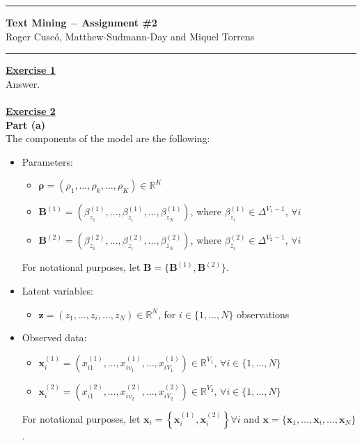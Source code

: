 \documentclass[a4paper, 11pt]{article}
\newcommand{\header}[2]{
\begin{flushleft}
		\rule{\linewidth}{0.6pt}
		\vspace{0.01cm}
		
		{\large{#1}}\\
		\vspace{0.1in}
		{#2}\\
		\vspace{0.1in}
		
		\rule{\linewidth}{0.6pt}
\end{flushleft}
}
\begin{document}
\header{\textbf{Text Mining $-$ Assignment \#2}}{Roger Cuscó, Matthew-Sudmann-Day and Miquel Torrens}
\textbf{\underline{Exercise 1}}\\
\newline Answer.\\
\pagebreak
\\
\newline \textbf{\underline{Exercise 2}}\\
\newline \textbf{Part (a)}\\
\newline The components of the model are the following:
\begin{itemize}
\item Parameters:
\begin{itemize}
\item $\pmb{\rho} = ( \rho_1, \dots, \rho_k, \dots, \rho_K ) \in \mathbb{R}^K$
\item $\mathbf{B}^{(1)} = \left( \beta_{z_1}^{(1)}, \dots, \beta_{z_i}^{(1)}, \dots, \beta_{z_N}^{(1)} \right)$, where $\beta_{z_i}^{(1)} \in \Delta^{V_1 - 1}$, $\forall i$
\item $\mathbf{B}^{(2)} = \left( \beta_{z_1}^{(2)}, \dots, \beta_{z_i}^{(2)}, \dots, \beta_{z_N}^{(2)} \right)$, where $\beta_{z_i}^{(2)} \in \Delta^{V_2 - 1}$, $\forall i$
\end{itemize}
For notational purposes, let $\mathbf{B} = \{ \mathbf{B}^{(1)}, \mathbf{B}^{(2)} \}$.
\item Latent variables:
\begin{itemize}
\item $\mathbf{z} = (z_1, \dots, z_i, \dots, z_N) \in \mathbb{R}^{N}$, for $i \in \{ 1, \dots, N \}$ observations
\end{itemize}
\item Observed data:
\begin{itemize}
\item $\mathbf{x}_i^{(1)} = \left( x_{i1}^{(1)}, \dots, x_{iv_1}^{(1)}, \dots, x_{iV_1}^{(1)} \right) \in \mathbb{R}^{V_1}$, $\forall i \in \{ 1, \dots, N \}$
\item $\mathbf{x}_i^{(2)} = \left( x_{i1}^{(2)}, \dots, x_{iv_2}^{(2)}, \dots, x_{iV_2}^{(2)} \right) \in \mathbb{R}^{V_2}$, $\forall i \in \{ 1, \dots, N \}$
\end{itemize}
For notational purposes, let $\mathbf{x}_i = \left\{ \mathbf{x}_i^{(1)}, \mathbf{x}_i^{(2)} \right\} \forall i$ and $\mathbf{x} = \{ \mathbf{x}_1, \dots, \mathbf{x}_i, \dots, \mathbf{x}_N \}$.
\end{itemize}
\end{document}
